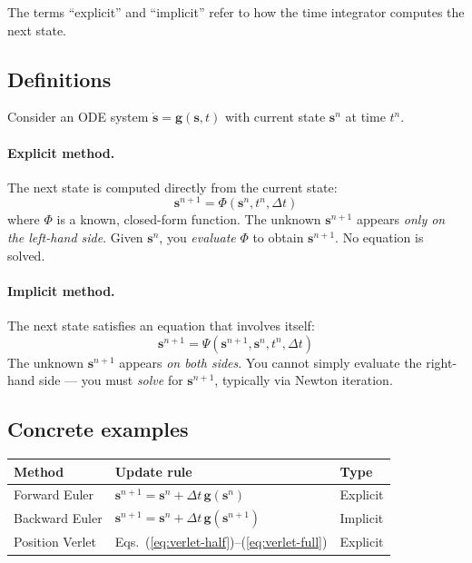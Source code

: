 \documentclass[11pt]{article}
\newcommand{\vect}[1]{\mathbf{#1}}
\begin{document}
The terms ``explicit'' and ``implicit'' refer to how the time integrator computes the next state.

\subsection{Definitions}

Consider an ODE system $\dot{\vect{s}} = \vect{g}(\vect{s}, t)$ with current state $\vect{s}^n$ at time $t^n$.

\paragraph{Explicit method.}
The next state is computed directly from the current state:
\begin{equation}
  \vect{s}^{n+1} = \Phi(\vect{s}^n, t^n, \Delta t)
  \label{eq:explicit-def}
\end{equation}
where $\Phi$ is a known, closed-form function.
The unknown $\vect{s}^{n+1}$ appears \emph{only on the left-hand side}.
Given $\vect{s}^n$, you \emph{evaluate} $\Phi$ to obtain $\vect{s}^{n+1}$.
No equation is solved.

\paragraph{Implicit method.}
The next state satisfies an equation that involves itself:
\begin{equation}
  \vect{s}^{n+1} = \Psi(\vect{s}^{n+1}, \vect{s}^n, t^n, \Delta t)
  \label{eq:implicit-def}
\end{equation}
The unknown $\vect{s}^{n+1}$ appears \emph{on both sides}.
You cannot simply evaluate the right-hand side --- you must \emph{solve} for $\vect{s}^{n+1}$, typically via Newton iteration.

\subsection{Concrete examples}

\begin{table}[H]
\centering
\renewcommand{\arraystretch}{1.3}
\begin{tabular}{@{}lll@{}}
\toprule
\textbf{Method} & \textbf{Update rule} & \textbf{Type} \\
\midrule
Forward Euler &
  $\vect{s}^{n+1} = \vect{s}^n + \Delta t\,\vect{g}(\vect{s}^n)$ &
  Explicit \\
Backward Euler &
  $\vect{s}^{n+1} = \vect{s}^n + \Delta t\,\vect{g}(\vect{s}^{n+1})$ &
  Implicit \\
Position Verlet &
  Eqs.~(\ref{eq:verlet-half})--(\ref{eq:verlet-full}) &
  Explicit \\
\bottomrule
\end{tabular}
\end{table}
\end{document}

